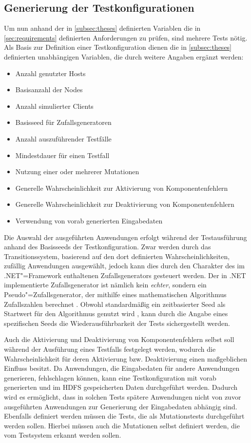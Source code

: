 \subsection{Generierung der Testkonfigurationen}
\label{subsec:testcaseGeneration}

Um nun anhand der in \cref{subsec:theses} definierten Variablen die in \cref{sec:requirements} definierten Anforderungen zu prüfen, sind mehrere Tests nötig.
Als Basis zur Definition einer Testkonfiguration dienen die in \cref{subsec:theses} definierten unabhängigen Variablen, die durch weitere Angaben ergänzt werden:

\begin{itemize}
    \item Anzahl genutzter Hosts
    \item Basisanzahl der Nodes
    \item Anzahl simulierter Clients
    \item Basisseed für Zufallsgeneratoren
    \item Anzahl auszuführender Testfälle
    \item Mindestdauer für einen Testfall
    \item Nutzung einer oder mehrerer Mutationen
    \item Generelle Wahrscheinlichkeit zur Aktivierung von Komponentenfehlern
    \item Generelle Wahrscheinlichkeit zur Deaktivierung von Komponentenfehlern
    \item Verwendung von vorab generierten Eingabedaten
\end{itemize}

Die Auswahl der ausgeführten Anwendungen erfolgt während der Testausführung anhand des Basisseeds der Testkonfiguration.
Zwar werden durch das Transitionssystem, basierend auf den dort definierten Wahrscheinlichkeiten, zufällig Anwendungen ausgewählt, jedoch kann dies durch den Charakter des im .NET"=Framework enthaltenen Zufallsgenerators gesteuert werden.
Der in .NET implementierte Zufallsgenerator ist nämlich kein \emph{echter}, sondern ein Pseudo"=Zufallsgenerator, der mithilfe eines mathematischen Algorithmus Zufallszahlen berechnet \cite{RandomClassDoc}.
Obwohl standardmäßig ein zeitbasierter Seed als Startwert für den Algorithmus genutzt wird \cite{RandomClassDoc}, kann durch die Angabe eines spezifischen Seeds die Wiederausführbarkeit der Tests sichergestellt werden.

Auch die Aktivierung und Deaktivierung von Komponentenfehlern selbst soll während der Ausführung eines Testfalls festgelegt werden, wodurch die Wahrscheinlichkeit für deren Aktivierung bzw. Deaktivierung einen maßgeblichen Einfluss besitzt.
Da Anwendungen, die Eingabedaten für andere Anwendungen generieren, \uU fehlschlagen können, kann eine Testkonfiguration mit vorab generierten und im HDFS gespeicherten Daten durchgeführt werden.
Dadurch wird es ermöglicht, dass in solchen Tests spätere Anwendungen nicht von zuvor ausgeführten Anwendungen zur Generierung der Eingabedaten abhängig sind.
Ebenfalls definiert werden müssen die Tests, die als Mutationstests durchgeführt werden sollen.
Hierbei müssen auch die Mutationen selbst definiert werden, die vom Testsystem erkannt werden sollen.

